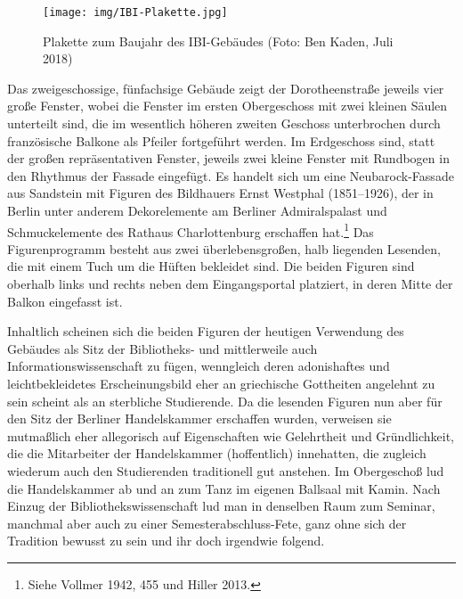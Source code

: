 \documentclass[a4paper,
fontsize=11pt,
oneside,
numbers=noperiodatend,
parskip=half-,
bibliography=totoc,
final
]{scrartcl}
\begin{document}
\begin{figure}
\centering
\texttt{[image: img/IBI-Plakette.jpg]}
\caption{Plakette zum Baujahr des IBI-Gebäudes (Foto: Ben Kaden, Juli
2018)}
\end{figure}

Das zweigeschossige, fünfachsige Gebäude zeigt der Dorotheenstraße
jeweils vier große Fenster, wobei die Fenster im ersten Obergeschoss mit
zwei kleinen Säulen unterteilt sind, die im wesentlich höheren zweiten
Geschoss unterbrochen durch französische Balkone als Pfeiler fortgeführt
werden. Im Erdgeschoss sind, statt der großen repräsentativen Fenster,
jeweils zwei kleine Fenster mit Rundbogen in den Rhythmus der Fassade
eingefügt. Es handelt sich um eine Neubarock-Fassade aus Sandstein mit
Figuren des Bildhauers Ernst Westphal (1851--1926), der in Berlin unter
anderem Dekorelemente am Berliner Admiralspalast und Schmuckelemente des
Rathaus Charlottenburg erschaffen hat.\footnote{Siehe Vollmer 1942, 455
  und Hiller 2013.} Das Figurenprogramm besteht aus zwei
überlebensgroßen, halb liegenden Lesenden, die mit einem Tuch um die
Hüften bekleidet sind. Die beiden Figuren sind oberhalb links und rechts
neben dem Eingangsportal platziert, in deren Mitte der Balkon eingefasst
ist.

Inhaltlich scheinen sich die beiden Figuren der heutigen Verwendung des
Gebäudes als Sitz der Bibliotheks- und mittlerweile auch
Informationswissenschaft zu fügen, wenngleich deren adonishaftes und
leichtbekleidetes Erscheinungsbild eher an griechische Gottheiten
angelehnt zu sein scheint als an sterbliche Studierende. Da die lesenden
Figuren nun aber für den Sitz der Berliner Handelskammer erschaffen
wurden, verweisen sie mutmaßlich eher allegorisch auf Eigenschaften wie
Gelehrtheit und Gründlichkeit, die die Mitarbeiter der Handelskammer
(hoffentlich) innehatten, die zugleich wiederum auch den Studierenden
traditionell gut anstehen. Im Obergeschoß lud die Handelskammer ab und
an zum Tanz im eigenen Ballsaal mit Kamin. Nach Einzug der
Bibliothekswissenschaft lud man in denselben Raum zum Seminar, manchmal
aber auch zu einer Semesterabschluss-Fete, ganz ohne sich der Tradition
bewusst zu sein und ihr doch irgendwie folgend.
\end{document}
